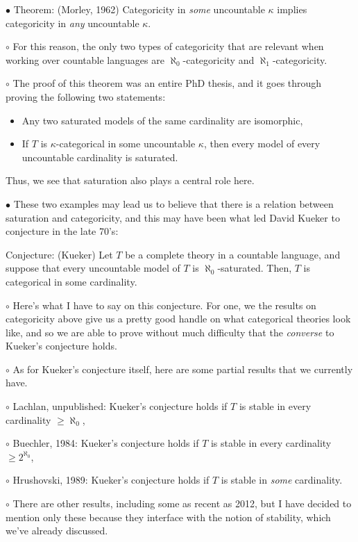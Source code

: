 \documentclass{article}
\newcommand\Point[1]{\noindent \hspace{\labelsep} {\large $\bullet$ #1} \smallskip}
\newcommand\point[1]{\noindent \hspace{\labelsep} {\small $\circ$ #1} \smallskip}
\begin{document}
\Point{Theorem: (Morley, 1962) Categoricity in \emph{some} uncountable $\kappa$ implies categoricity in \emph{any} uncountable $\kappa$.}

\point{For this reason, the only two types of categoricity that are relevant when working over countable languages are $\aleph_0$-categoricity and $\aleph_1$-categoricity.}

\point{The proof of this theorem was an entire PhD thesis, and it goes through proving the following two statements:
\begin{itemize}
\item Any two saturated models of the same cardinality are isomorphic,
\item If $T$ is $\kappa$-categorical in some uncountable $\kappa$, then every model of every uncountable cardinality is saturated.
\end{itemize}

Thus, we see that saturation also plays a central role here.}

\Point{These two examples may lead us to believe that there is a relation between saturation and categoricity, and this may have been what led David Kueker to conjecture in the late 70's:

Conjecture: (Kueker) Let $T$ be a complete theory in a countable language, and suppose that every uncountable model of $T$ is $\aleph_0$-saturated. Then, $T$ is categorical in some cardinality.}

\point{Here's what I have to say on this conjecture. For one, we the results on categoricity above give us a pretty good handle on what categorical theories look like, and so we are able to prove without much difficulty that the \emph{converse} to Kueker's conjecture holds.}

\point{As for Kueker's conjecture itself, here are some partial results that we currently have.}

\point{Lachlan, unpublished: Kueker's conjecture holds if $T$ is stable in every cardinality $\geq \aleph_0$,}

\point{Buechler, 1984: Kueker's conjecture holds if $T$ is stable in every cardinality $\geq 2^{\aleph_0}$,}

\point{Hrushovski, 1989: Kueker's conjecture holds if $T$ is stable in \emph{some} cardinality.}

\point{There are other results, including some as recent as 2012, but I have decided to mention only these because they interface with the notion of stability, which we've already discussed.}
\end{document}

